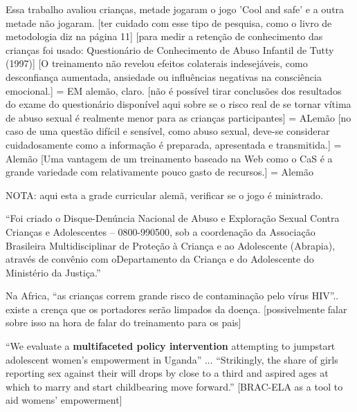 Essa trabalho avaliou crianças, metade jogaram o jogo 'Cool and safe' e a outra metade não jogaram. \cite{fingerleabschlussbericht} [ter cuidado com esse tipo de pesquisa, como o livro de metodologia diz na página 11]
[para medir a retenção de conhecimento das crianças foi usado: Questionário de Conhecimento de Abuso Infantil de Tutty (1997)]
[O treinamento não revelou efeitos colaterais indesejáveis, como desconfiança aumentada, ansiedade ou influências negativas na consciência emocional.] = EM alemão, claro.
[não é possível tirar conclusões dos resultados do exame do questionário disponível aqui sobre se o risco real de se tornar vítima de abuso sexual é realmente menor para as crianças participantes] = ALemão
[no caso de uma questão difícil e sensível, como abuso sexual, deve-se considerar cuidadosamente como a informação é preparada, apresentada e transmitida.] = Alemão
[Uma vantagem de um treinamento baseado na Web como o CaS é a grande variedade com relativamente pouco gasto de recursos.] = Alemão

NOTA: aqui esta a grade curricular alemã, verificar se o jogo é ministrado.

``Foi criado o Disque-Denúncia Nacional de Abuso e Exploração Sexual Contra
Crianças e Adolescentes – 0800-990500, sob a coordenação da Associação Brasileira
Multidisciplinar de Proteção à Criança e ao Adolescente (Abrapia), através de convênio com oDepartamento da Criança e do Adolescente do Ministério da Justiça.''



Na Africa, ``as crianças correm grande risco de contaminação pelo vírus HIV''.. existe a crença que os portadores serão limpados da doença. \cite{aded2006abuso} [possivelmente falar sobre isso na hora de falar do treinamento para os pais]

``We evaluate a \textbf{multifaceted policy intervention} attempting to jumpstart adolescent women’s empowerment in Uganda'' ... ``Strikingly, the share of girls reporting sex against their will drops by close to a third and aspired ages at which to marry and start childbearing move forward.'' \cite{bandiera2017women} [BRAC-ELA as a tool to aid womens’ empowerment]

